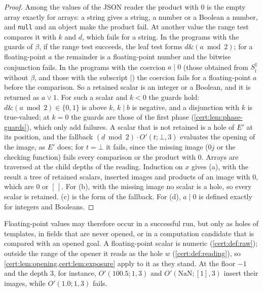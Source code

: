 \begin{proof}
Among the values of the JSON reader the product with $0$ is the empty array exactly for
arrays: a string gives a string, a number or a Boolean a number, and \texttt{null} and an
object make the product fail. At another value the range test compares it with $k$ and $d$,
which fails for a string. In the programs with the guards of $\beta$, if the range test
succeeds, the leaf test forms $d\mathbin{\&}(a\bmod 2)$; for a floating-point $a$ the remainder
is a floating-point number and the bitwise conjunction fails. In the programs with the coercion
$a\mathbin{|}0$ (those obtained from $S^{\natural}_{\mathrm i}$ without $\beta$, and those with the
subscript $|$) the coercion fails for a floating-point $a$ before the comparison. So a retained
scalar is an integer or a Boolean, and it is returned as $a\lor 1$. For such a scalar and $k<0$
the guards hold: $d\mathbin{\&}(a\bmod 2)\in\{0,1\}$ is above $k$, $k\mathbin{|}b$ is negative,
and a disjunction with $k$ is true-valued; at $k=0$ the guards are those of the first phase
(\cref{cert:lem:phase-guards}), which only add failures. A scalar that is not retained is a hole of $E'$ at its position, and
the fallback $(d\bmod 2)\cdot O'(t;\bot,3)$ evaluates the opening of the image, as $E'$ does;
for $t=\bot$ it fails, since the missing image ($0j$ or the checking function) fails every
comparison or the product with $0$. Arrays are traversed at the child depths of the reading.
Induction on $x$ gives (a), with the result a tree of retained scalars, inserted images and
products of an image with $0$, which are $0$ or $[\,]$. For (b), with the missing image no
scalar is a hole, so every scalar is retained. (c) is the form of the fallback. For (d),
$a\mathbin{|}0$ is defined exactly for integers and Booleans.
\end{proof}

Floating-point values may therefore occur in a successful run, but only as holes of templates,
in fields that are never opened, or in a computation candidate that is compared with an opened
goal. A floating-point scalar is numeric (\cref{cert:def:raw}); outside the range of the opener
it reads as the hole $w$ (\cref{cert:def:reading}), so \cref{cert:lem:opening,cert:lem:exposure}
apply to it as they stand. At the floor $-1$ and the depth $3$, for instance,
$O'(100.5;1,3)$ and $O'(\mathrm{NaN};[1],3)$ insert their images, while $O'(1.0;1,3)$ fails.

